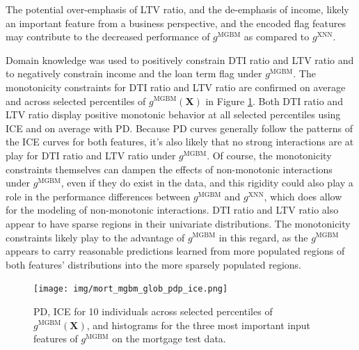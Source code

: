 \documentclass[information,article,submit,moreauthors,pdftex]{definitions/mdpi}
\begin{document}
{\noindent The potential over-emphasis of LTV ratio, and the de-emphasis of income, likely an important feature from a business perspective, and the encoded flag features may contribute to the decreased performance of $g^\text{MGBM}$ as compared to $g^\text{XNN}$.

Domain knowledge was used to positively constrain DTI ratio and LTV ratio and to negatively constrain income and the loan term flag under $g^\text{MGBM}$. The monotonicity constraints for DTI ratio and LTV ratio are confirmed on average and across selected percentiles of $g^\text{MGBM}(\mathbf{X})$ in Figure \ref{fig:mort_mgbm_glob_pdp_ice}. Both DTI ratio and LTV ratio display positive monotonic behavior at all selected percentiles using ICE and on average with PD. Because PD curves generally follow the patterns of the ICE curves for both features, it's also likely that no strong interactions are at play for DTI ratio and LTV ratio under $g^\text{MGBM}$. Of course, the monotonicity constraints themselves can dampen the effects of non-monotonic interactions under $g^\text{MGBM}$, even if they do exist in the data, and this rigidity could also play a role in the performance differences between $g^\text{MGBM}$ and $g^\text{XNN}$, which does allow for the modeling of non-monotonic interactions. DTI ratio and LTV ratio also appear to have sparse regions in their univariate distributions. The monotonicity constraints likely play to the advantage of $g^\text{MGBM}$ in this regard, as the $g^\text{MGBM}$ appears to carry reasonable predictions learned from more populated regions of both features' distributions into the more sparsely populated regions. 

\begin{figure}[H]
\centering
\texttt{[image: img/mort\_mgbm\_glob\_pdp\_ice.png]}
\caption{PD, ICE for 10 individuals across selected percentiles of $g^\text{MGBM}(\mathbf{X})$, and histograms for the three most important input features of $g^\text{MGBM}$ on the mortgage test data.}
\label{fig:mort_mgbm_glob_pdp_ice}
\end{figure}   

}
\end{document}
